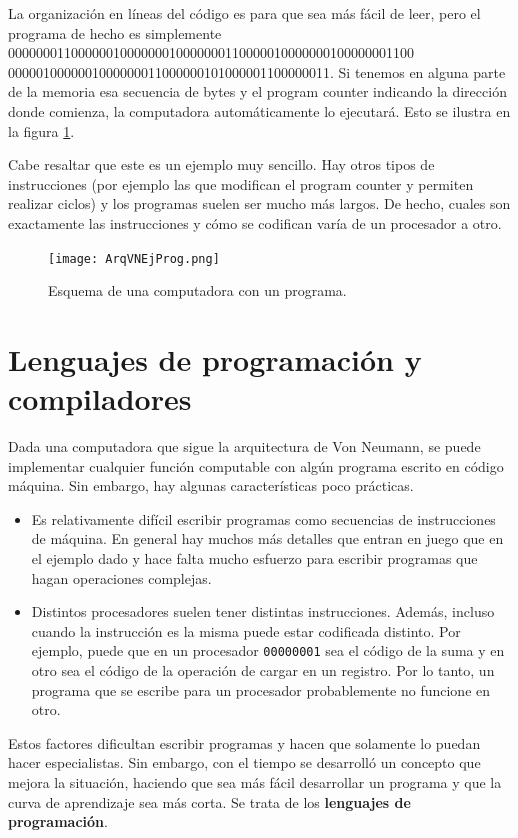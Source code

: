 \documentclass[a4paper, 12pt]{report}
\begin{document}
La organización en líneas del código es para que sea más fácil de leer, pero el programa de hecho es simplemente 0000000110000001000000010000000110000010000000100000001100 0000010000001000000011000000101000001100000011. Si tenemos en alguna parte de la memoria esa secuencia de bytes y el program counter indicando la dirección donde comienza, la computadora automáticamente lo ejecutará. Esto se ilustra en la figura \ref{fig-ArqVNEjProg}.

Cabe resaltar que este es un ejemplo muy sencillo. Hay otros tipos de instrucciones (por ejemplo las que modifican el program counter y permiten realizar ciclos) y los programas suelen ser mucho más largos. De hecho, cuales son exactamente las instrucciones y cómo se codifican varía de un procesador a otro.

\begin{figure}
	\centering
	\texttt{[image: ArqVNEjProg.png]}
	\caption{Esquema de una computadora con un programa.}
	\label{fig-ArqVNEjProg}
\end{figure}

\section{Lenguajes de programación y compiladores}

Dada una computadora que sigue la arquitectura de Von Neumann, se puede implementar cualquier función computable con algún programa escrito en código máquina. Sin embargo, hay algunas características poco prácticas.
\begin{itemize}
	\item Es relativamente difícil escribir programas como secuencias de instrucciones de máquina. En general hay muchos más detalles que entran en juego que en el ejemplo dado y hace falta mucho esfuerzo para escribir programas que hagan operaciones complejas.
	\item Distintos procesadores suelen tener distintas instrucciones. Además, incluso cuando la instrucción es la misma puede estar codificada distinto. Por ejemplo, puede que en un procesador {\tt 00000001} sea el código de la suma y en otro sea el código de la operación de cargar en un registro. Por lo tanto, un programa que se escribe para un procesador probablemente no funcione en otro.
\end{itemize}
Estos factores dificultan escribir programas y hacen que solamente lo puedan hacer especialistas. Sin embargo, con el tiempo se desarrolló un concepto que mejora la situación, haciendo que sea más fácil desarrollar un programa y que la curva de aprendizaje sea más corta. Se trata de los {\bf lenguajes de programación}.
\end{document}
